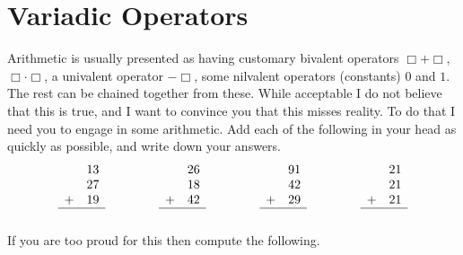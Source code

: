 

\section{Variadic Operators}
Arithmetic is usually presented as having customary bivalent operators $\Box+\Box$, 
$\Box\cdot\Box$, a univalent operator $-\Box$, some nilvalent operators (constants)
$0$ and $1$.  The rest can be chained together from these.  While acceptable 
I do not believe that this is true, and I want to convince you that this 
misses reality.  To do that I need you to engage in some arithmetic.
Add each of the following in your head as quickly as possible, and write down your answers.
\begin{equation*}
\begin{array}{cc}
    & 13\\
    & 27\\
   + & 19\\
\hline\\
\end{array}
\hspace{1.5cm}
\begin{array}{cc}
    & 26\\
    & 18\\
  + & 42\\
\hline\\
\end{array}
\hspace{1.5cm}
\begin{array}{cc}
    & 91\\
    & 42\\
  + & 29\\
\hline\\
\end{array}
\hspace{1.5cm}
\begin{array}{cc}
    & 21\\
    & 21\\
  + & 21\\
\hline\\
\end{array}
\end{equation*}
If you are too proud for this then compute the following.
